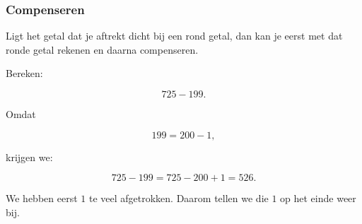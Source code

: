\documentclass{ximera}
\begin{document}

\subsubsection*{Compenseren}

Ligt het getal dat je aftrekt dicht bij een rond getal, dan kan je eerst
met dat ronde getal rekenen en daarna compenseren.

\begin{voorbeeld}

Bereken:

\[
725-199.
\]

Omdat

\[
199=200-1,
\]

krijgen we:

\[
725-199
=
725-200+1
=
526.
\]

We hebben eerst \(1\) te veel afgetrokken. Daarom tellen we die \(1\)
op het einde weer bij.

\end{voorbeeld}
\end{document}

